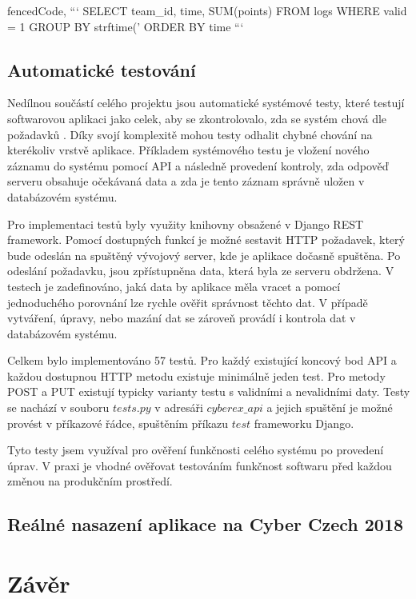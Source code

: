 \documentclass[
  digital, %
  twoside, %
  table,   %
  lof,     %
  lot,     %
]{fithesis3}
\begin{document}
\begin{markdown*}{%
  fencedCode,
}
```
SELECT team_id, time, SUM(points) FROM logs 
WHERE valid = 1 
GROUP BY strftime('%
ORDER BY time
```
\end{markdown*}

\section{Automatické testování}

Nedílnou součástí celého projektu jsou automatické systémové testy, které testují softwarovou aplikaci jako celek, aby se zkontrolovalo, zda se systém chová dle požadavků \cite{difSysTest}. Díky svojí komplexitě mohou testy odhalit chybné chování na kterékoliv vrstvě aplikace. Příkladem systémového testu je vložení nového záznamu do systému pomocí API a následně provedení kontroly, zda odpověď serveru obsahuje očekávaná data a zda je tento záznam správně uložen v databázovém systému.

Pro implementaci testů byly využity knihovny obsažené v Django REST framework. Pomocí dostupných funkcí je možné sestavit HTTP požadavek, který bude odeslán na spuštěný vývojový server, kde je aplikace dočasně spuštěna. Po odeslání požadavku, jsou zpřístupněna data, která byla ze serveru obdržena. V testech je zadefinováno, jaká data by aplikace měla vracet a pomocí jednoduchého porovnání lze rychle ověřit správnost těchto dat. V případě vytváření, úpravy, nebo mazání dat se zároveň provádí i kontrola dat v databázovém systému. 

Celkem bylo implementováno 57 testů. Pro každý existující koncový bod API a každou dostupnou HTTP metodu existuje minimálně jeden test. Pro metody POST a PUT existují typicky varianty testu s validními a nevalidními daty. Testy se nachází v souboru $tests.py$ v adresáři $cyberex\_api$ a jejich spuštění je možné provést v příkazové řádce, spuštěním příkazu $test$ frameworku Django.

Tyto testy jsem využíval pro ověření funkčnosti celého systému po provedení úprav. V praxi je vhodné ověřovat testováním funkčnost softwaru před každou změnou na produkčním prostředí.

\section{Reálné nasazení aplikace na Cyber Czech 2018}



\chapter{Závěr}

\printbibliography[heading=bibintoc] %
\end{document}

